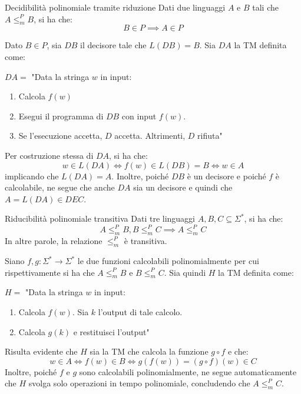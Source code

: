 \begin{Thm}{ Decidibilità polinomiale tramite riduzione}{}
Dati due linguaggi $A$ e $B$ tali che $A \leq^P_m B$, si ha che:
\begin{equation*}
    B\in P\implies A\in P
\end{equation*}

\begin{demonstration}
Dato $B\in P$, sia $DB$ il decisore tale che $L(DB) = B$. Sia $DA$ la TM definita come:

$DA =$ "Data la stringa $w$ in input:
\begin{enumerate}
    \item Calcola $f(w)$
    \item Esegui il programma di $DB$ con input $f(w)$.
    \item Se l’esecuzione accetta, $D$ accetta. Altrimenti, $D$ rifiuta"
\end{enumerate}
Per costruzione stessa di $DA$, si ha che:
\begin{equation*}
    w\in L(DA)\iff f(w)\in L(DB) = B\iff w\in A    
\end{equation*}
implicando che $L(DA) = A$. Inoltre, poiché $DB$ è un decisore e poiché $f$ è calcolabile, ne segue che anche $DA$ sia un decisore e quindi che $A = L(DA)\in DEC$.
\end{demonstration}
\end{Thm}

\begin{Thm}{Riducibilità polinomiale transitiva}{}
Dati tre linguaggi $A, B, C \subseteq \Sigma^*$, si ha che:
\begin{equation*}
A \leq^P_m B, B \leq^P_m C \implies A \leq^P_m C    
\end{equation*}
In altre parole, la relazione $\leq^P_m$ è transitiva.

\begin{demonstration}
Siano $f, g : \Sigma^* \to \Sigma^*$ le due funzioni calcolabili polinomialmente per cui rispettivamente si ha che $A \leq^P_m B$ e $B \leq^P_m C$. Sia quindi $H$ la TM definita come:

$H =$ "Data la stringa $w$ in input:
\begin{enumerate}
    \item Calcola $f(w)$. Sia $k$ l’output di tale calcolo.
    \item Calcola $g(k)$ e restituisci l’output"
\end{enumerate}
Risulta evidente che $H$ sia la TM che calcola la funzione $g\circ f$ e che:
\begin{equation*}
    w\in A \iff f(w) \in B \iff g(f(w)) = (g \circ f)(w) \in C
\end{equation*}
Inoltre, poiché $f$ e $g$ sono calcolabili polinomialmente, ne segue automaticamente che $H$ svolga solo operazioni in tempo polinomiale, concludendo che $A \leq^P_m C$.
\end{demonstration}
\end{Thm}

